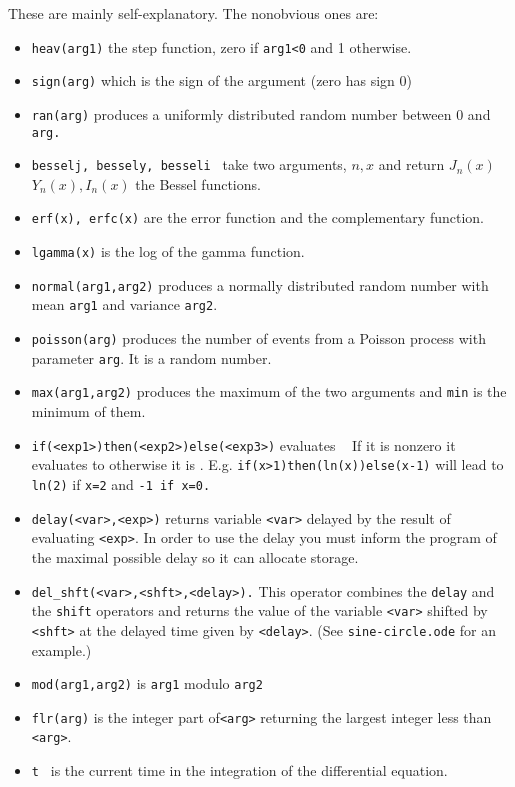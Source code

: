 These are mainly self-explanatory. The nonobvious ones are:
\begin{itemize}\itemsep -.05in
\item {\tt heav(arg1)} the step function, zero if {\tt arg1<0} and 1 otherwise.
\item {\tt sign(arg)} which is the sign of the argument (zero has sign 0)
\item {\tt ran(arg)} produces a uniformly distributed random number
between 0 and {\tt arg.}
\item {\tt besselj, bessely, besseli  } take two arguments, $n,x$ and return
$J_n(x)$ $Y_n(x),I_n(x)$ the Bessel functions.
\item { \tt erf(x), erfc(x)} are the error function and the
complementary function. 
\item {\tt lgamma(x)} is the log of the gamma function. 
\item {\tt normal(arg1,arg2)} produces a normally distributed random number
with mean {\tt arg1}  and variance {\tt arg2}.
\item {\tt poisson(arg)} produces the number of events from a Poisson process with parameter {\tt arg}.  It is a random number.  
\item {\tt max(arg1,arg2)} produces the maximum of the two arguments
and {\tt min}  is 
the minimum of them.
\item {\tt if(<exp1>)then(<exp2>)else(<exp3>)} evaluates {\tt <exp1> }
If it is nonzero 
it evaluates to {\tt <exp2>} otherwise it is { \tt <exp3>}.  E.g. {\tt if(x>1)then(ln(x))else(x-1)}
will lead to {\tt ln(2)}  if {\tt x=2}  and { \tt -1 if x=0.}
\item {\tt delay(<var>,<exp>)} returns variable {\tt <var>} delayed by the result of
 evaluating {\tt <exp>}.  In order to use the delay you must inform
the program of the maximal possible delay so it can allocate storage.
\item {\tt del\_shft(<var>,<shft>,<delay>).} This operator combines the
{\tt delay} and the {\tt shift} operators and returns the value of the
variable {\tt <var>} shifted by {\tt <shft>} at the delayed time given
by {\tt <delay>}. (See {\tt sine-circle.ode} for an example.)
\item {\tt mod(arg1,arg2)} is {\tt arg1} modulo {\tt arg2}
\item {\tt  flr(arg)}  is the integer part of{\tt  <arg>} returning the largest integer less than {\tt <arg>}.  
\item  {\tt t } is the current time in the integration of the differential equation.

\end{itemize}

